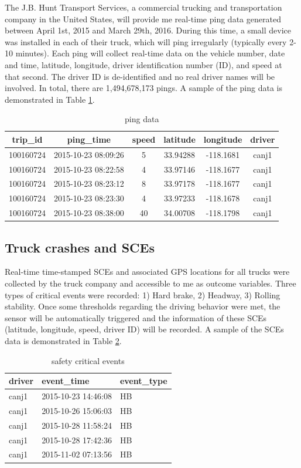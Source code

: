\documentclass[12pt]{book}
\numberwithin{equation}{chapter}
\begin{document}
The J.B. Hunt Transport Services, a commercial trucking and transportation company in the United States, will provide me real-time ping data generated between April 1st, 2015 and March 29th, 2016. During this time, a small device was installed in each of their truck, which will ping irregularly (typically every 2-10 minutes). Each ping will collect real-time data on the vehicle number, date and time, latitude, longitude, driver identification number (ID), and speed at that second. The driver ID is de-identified and no real driver names will be involved. In total, there are 1,494,678,173 pings. A sample of the ping data is demonstrated in Table \ref{tab:ping}.

\begin{longtable}{cccccc}
\caption{\label{tab:ping}ping data}\\
\toprule
trip\_id & ping\_time & speed & latitude & longitude & driver\\
\midrule
100160724 & 2015-10-23 08:09:26 & 5 & 33.94288 & -118.1681 & canj1\\
100160724 & 2015-10-23 08:22:58 & 4 & 33.97146 & -118.1677 & canj1\\
100160724 & 2015-10-23 08:23:12 & 8 & 33.97178 & -118.1677 & canj1\\
100160724 & 2015-10-23 08:23:30 & 4 & 33.97233 & -118.1678 & canj1\\
100160724 & 2015-10-23 08:38:00 & 40 & 34.00708 & -118.1798 & canj1\\
\bottomrule
\end{longtable}

\hypertarget{truck-crashes-and-sces}{%
\subsection{Truck crashes and SCEs}\label{truck-crashes-and-sces}}

Real-time time-stamped SCEs and associated GPS locations for all trucks were collected by the truck company and accessible to me as outcome variables. Three types of critical events were recorded: 1) Hard brake, 2) Headway, 3) Rolling stability. Once some thresholds regarding the driving behavior were met, the sensor will be automatically triggered and the information of these SCEs (latitude, longitude, speed, driver ID) will be recorded. A sample of the SCEs data is demonstrated in Table \ref{tab:SCE}.

\begin{table}[t]

\caption{\label{tab:SCE}safety critical events}
\centering
\begin{tabular}{lll}
\toprule
driver & event\_time & event\_type\\
\midrule
canj1 & 2015-10-23 14:46:08 & HB\\
canj1 & 2015-10-26 15:06:03 & HB\\
canj1 & 2015-10-28 11:58:24 & HB\\
canj1 & 2015-10-28 17:42:36 & HB\\
canj1 & 2015-11-02 07:13:56 & HB\\
\bottomrule
\end{tabular}
\end{table}
\end{document}
